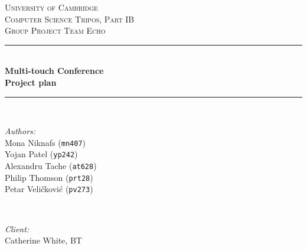 \documentclass[12p, a4paper, onecolumn]{report}
\begin{document}
\begin{titlepage}

\newcommand{\HRule}{\rule{\linewidth}{0.5mm}} %
\clearpage
\vspace*{\fill}
\center %
 

\textsc{\LARGE University of Cambridge}\\[1.5cm] %
\textsc{\Large Computer Science Tripos, Part IB}\\[0.5cm] %
\textsc{\large Group Project Team Echo}\\[0.5cm] %


\HRule \\[0.4cm]
{ \huge \bfseries Multi-touch Conference}\\[0.4cm]
{ \huge \bfseries Project plan}\\[0.1cm] %
\HRule \\[1.5cm]
 

\begin{minipage}{0.4\textwidth}
\begin{flushleft} \large
\emph{Authors:}\\
Mona Niknafs (\texttt{mn407})\\
Yojan Patel (\texttt{yp242})\\
Alexandru Tache (\texttt{at628})\\
Philip Thomson (\texttt{prt28})\\
Petar Veli\v{c}kovi\'{c} (\texttt{pv273})\\
\end{flushleft}
\end{minipage}
~
\begin{minipage}{0.4\textwidth}
\begin{flushright} \large
\emph{Client:} \\
Catherine White, BT\\ 
\hfill \\
\hfill \\
\hfill \\
\hfill \\
\end{flushright}
\end{minipage}\\[4cm]


\end{titlepage}
\end{document}
